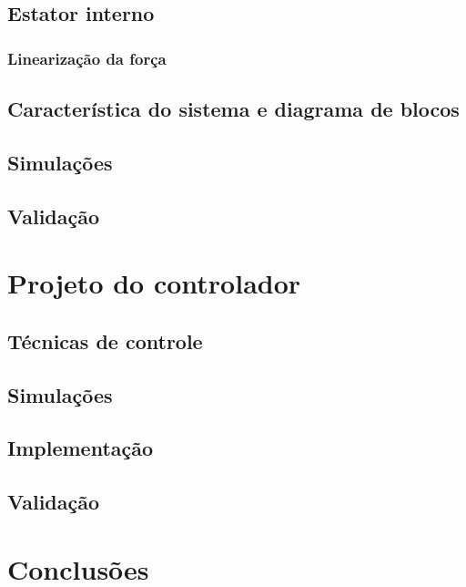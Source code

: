 \documentclass[a4paper,10pt]{report}
\begin{document}
\section{Estator interno}
\subsection{Linearização da força}
\section{Característica do sistema e diagrama de blocos}
\section{Simulações}
\section{Validação}

\chapter{Projeto do controlador}
\section{Técnicas de controle}
\section{Simulações}
\section{Implementação}
\section{Validação}

\chapter{Conclusões}
\end{document}
